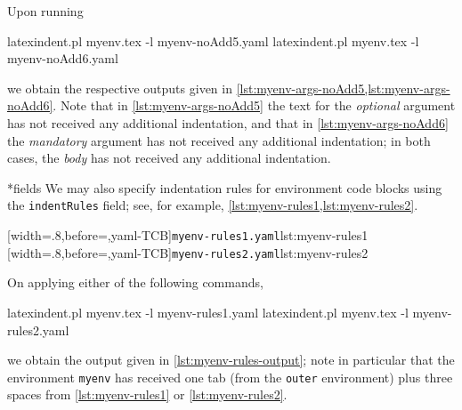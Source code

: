  Upon running 
 \begin{commandshell}
latexindent.pl myenv.tex -l myenv-noAdd5.yaml  
latexindent.pl myenv.tex -l myenv-noAdd6.yaml  
\end{commandshell}
 we obtain the respective outputs given in
 \cref{lst:myenv-args-noAdd5,lst:myenv-args-noAdd6}. Note that in
 \cref{lst:myenv-args-noAdd5} the text for the \emph{optional} argument has not received
 any additional indentation, and that in \cref{lst:myenv-args-noAdd6} the \emph{mandatory}
 argument has not received any additional indentation; in both cases, the \emph{body} has
 not received any additional indentation.

 \begin{minipage}{.45\textwidth}
 \end{minipage}
 \hfill
 \begin{minipage}{.45\textwidth}
 \end{minipage}

*{fields}
 We may also specify indentation rules for environment code blocks using the
 \texttt{indentRules} field; see, for example, \cref{lst:myenv-rules1,lst:myenv-rules2}.

 \begin{cmhtcbraster}[raster column skip=.1\linewidth]
  [width=.8\linewidth,before=\centering,yaml-TCB]{\texttt{myenv-rules1.yaml}}{lst:myenv-rules1}
  [width=.8\linewidth,before=\centering,yaml-TCB]{\texttt{myenv-rules2.yaml}}{lst:myenv-rules2}
 \end{cmhtcbraster}

 On applying either of the following commands, 
 \begin{commandshell}
latexindent.pl myenv.tex -l myenv-rules1.yaml  
latexindent.pl myenv.tex -l myenv-rules2.yaml  
\end{commandshell}
 we obtain the output given in \cref{lst:myenv-rules-output}; note in particular that the
 environment \texttt{myenv} has received one tab (from the \texttt{outer} environment)
 plus three spaces from \cref{lst:myenv-rules1} or \ref{lst:myenv-rules2}.

